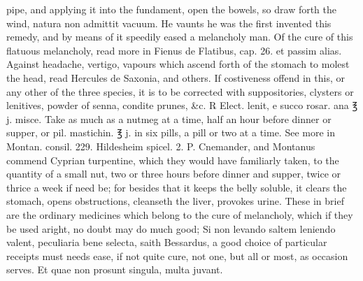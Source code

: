 pipe, and applying it into the fundament, open the bowels, so draw
forth the wind, natura non admittit vacuum. He vaunts he was the first
invented this remedy, and by means of it speedily eased a melancholy
man. Of the cure of this flatuous melancholy, read more in Fienus de
Flatibus, cap. 26. et passim alias.
Against headache, vertigo, vapours which ascend forth of the stomach to
molest the head, read Hercules de Saxonia, and others.
If costiveness offend in this, or any other of the three species, it is
to be corrected with suppositories, clysters or lenitives, powder of
senna, condite prunes, \&c. ℞ Elect. lenit, e succo rosar. ana ℥ j.
misce. Take as much as a nutmeg at a time, half an hour before dinner
or supper, or pil. mastichin. ℥ j. in six pills, a pill or two at a
time. See more in Montan. consil. 229. Hildesheim spicel. 2. P.
Cnemander, and Montanus commend Cyprian turpentine, which they
would have familiarly taken, to the quantity of a small nut, two or
three hours before dinner and supper, twice or thrice a week if need
be; for besides that it keeps the belly soluble, it clears the stomach,
opens obstructions, cleanseth the liver, provokes urine.
These in brief are the ordinary medicines which belong to the cure of
melancholy, which if they be used aright, no doubt may do much good; Si
non levando saltem leniendo valent, peculiaria bene selecta, saith
Bessardus, a good choice of particular receipts must needs ease, if not
quite cure, not one, but all or most, as occasion serves. Et quae non
prosunt singula, multa juvant.
